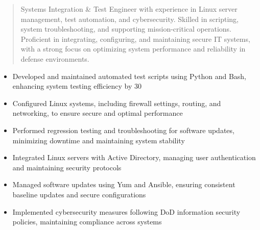 



\makecvheader

\begin{quote}
  \noindent
  Systems Integration & Test Engineer with experience in Linux server management, test automation, and cybersecurity. Skilled in scripting, system troubleshooting, and supporting mission-critical operations. Proficient in integrating, configuring, and maintaining secure IT systems, with a strong focus on optimizing system performance and reliability in defense environments.
\end{quote}

\par\smallskip
\noindent
\begin{minipage}{20cm}
  \begin{minipage}{9.75cm}
    \begin{itemize}
      \item Developed and maintained automated test scripts using Python and Bash, enhancing system testing efficiency by 30%
      \item Configured Linux systems, including firewall settings, routing, and networking, to ensure secure and optimal performance
      \item Performed regression testing and troubleshooting for software updates, minimizing downtime and maintaining system stability
    \end{itemize}
  \end{minipage}
  \hfill
  \begin{minipage}{9.75cm}
    \begin{itemize}
      \item Integrated Linux servers with Active Directory, managing user authentication and maintaining security protocols
      \item Managed software updates using Yum and Ansible, ensuring consistent baseline updates and secure configurations
      \item Implemented cybersecurity measures following DoD information security policies, maintaining compliance across systems
    \end{itemize}
  \end{minipage}
\end{minipage}
\par\smallskip
\divider

